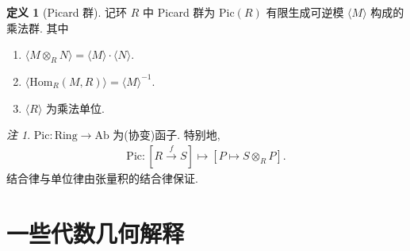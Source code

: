 \documentclass{MainStyle}
\theoremstyle{definition}
\theoremstyle{definition}
\theoremstyle{definition}
\newtheorem{definition}{定义}
\theoremstyle{definition}
\theoremstyle{definition}
\theoremstyle{definition}
\theoremstyle{definition}
\theoremstyle{remark}
\newtheorem{remark}{注}
\theoremstyle{remark}
\begin{document}
\begin{definition}[Picard 群]
    记环 $R$ 中 Picard 群为 $\mathrm{Pic}(R)$ 有限生成可逆模 $\langle M\rangle$ 构成的乘法群. 其中
    \begin{enumerate}
        \item $\langle M\otimes_R N\rangle=\langle M\rangle\cdot \langle  N\rangle$.
        \item $\langle \mathrm{Hom}_R(M,R)\rangle=\langle M\rangle^{-1}$.
        \item $\langle R\rangle$ 为乘法单位.
    \end{enumerate}
\end{definition}

\begin{remark}
    $\mathrm{Pic}:\mathrm{Ring}\to \mathrm{Ab}$ 为(协变)函子. 特别地,
    \begin{align*}
        \mathrm{Pic}:\left[R\overset f\longrightarrow S\right]\mapsto [P\mapsto S\otimes_R P].
    \end{align*}
    结合律与单位律由张量积的结合律保证.
\end{remark}

\section{一些代数几何解释}
\end{document}
